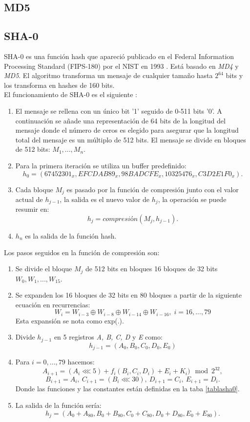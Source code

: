 \begin{aligned*}
\subsection{MD5}

\subsection{SHA-0}
SHA-0 es una función hash que apareció publicado en el Federal Information Processing Standard (FIPS-180) por el NIST en 1993 \cite{Penard2008}\cite{sha01}. Está basado en \emph{MD4} y \emph{MD5}. El algoritmo transforma un mensaje de cualquier tamaño hasta $2^{64}$ bits y los transforma en hashes de 160 bits.\\
El funcionamiento de SHA-0 es el siguiente \cite{sha0}:
\begin{enumerate}
	\item El mensaje se rellena con un único bit '1' seguido de 0-511 bits '0'. A continuación se añade una representación de 64 bits de la longitud del mensaje donde el número de ceros es elegido para asegurar que la longitud total del mensaje es un múltiplo de 512 bits. El mensaje se divide en bloques de 512 bits: $M_1,...,M_n$.
	\item Para la primera iteración se utiliza un buffer predefinido:
	$$
		h_0=(67452301_x, EFCDAB89_x, 98BADCFE_x, 10325476_x, C3D2E1F0_x).
	$$
	\item Cada bloque $M_j$ es pasado por la función de compresión junto con el valor actual de $h_{j-1}$, la salida es el nuevo valor de $h_j$, la operación se puede resumir en:
	$$
		h_j=compresión(M_j,h_{j-1}).
	$$
	\item $h_n$ es la salida de la función hash.
\end{enumerate}
Los pasos seguidos en la función de compresión son:
\begin{enumerate}
	\item Se divide el bloque $M_j$ de 512 bits en bloques 16 bloques de 32 bits $W_0,W_1,...,W_{15}$. 
	\item Se expanden los 16 bloques de 32 bits en 80 bloques a partir de la siguiente ecuación en recurrencias:
	$$
		W_i=W_{i-3}\oplus W_{i-8}\oplus W_{i-14}\oplus W_{i-16},\; i=16,...,79
	$$
	Esta expansión se nota como exp(.).
	\item Divide $h_{j-1}$ en 5 registros \emph{A, B, C, D} y \emph{E} como:
	$$
		h_{j-1} = (A_0, B_0, C_0, D_0, E_0)
	$$
	\item Para $i=0,...,79$ hacemos:
	$$
		A_{i+1}=(A_i\lll5)+f_i(B_i,C_i,D_i)+E_i+K_i) \mod 2^{32},
	$$
	$$
		B_{i+1}=A_i,\: C_{i+1}=(B_i\lll30),\: D_{i+1}=C_i,\: E_{i+1}=D_i.
	$$
	Donde las funciones y las constantes están definidas en la taba \ref{tablasha0}.
	\item La salida de la función sería:
	$$
		h_j=(A_0+A_{80}, B_0+B_{80}, C_0+C_{80}, D_0+D_{80}, E_0+E_{80}).
	$$
\end{enumerate}


\end{aligned*}
